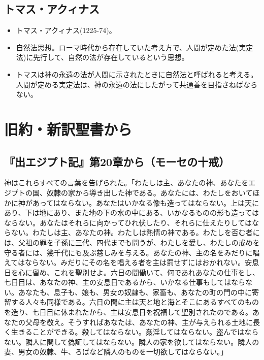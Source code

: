 \documentclass[uplatex,dvipdfmx]{jsarticle} \usepackage{mystyle}%
\begin{document}
\subsection{トマス・アクィナス}
\begin{itemize}
\item トマス・アクィナス(1225-74)。
\item 自然法思想。ローマ時代から存在していた考え方で、人間が定めた法(実定法)に先行して、自然の法が存在しているという思想。
\item トマスは神の永遠の法が人間に示されたときに自然法と呼ばれると考える。人間が定める実定法は、神の永遠の法にしたがって共通善を目指さねばならない。
\end{itemize}





\section{旧約・新訳聖書から}



\subsection*{『出エジプト記』第20章から（モーセの十戒）}

神はこれらすべての言葉を告げられた。「わたしは主、あなたの神、あなたをエジプトの国、奴隷の家から導き出した神である。あなたには、わたしをおいてほかに神があってはならない。あなたはいかなる像も造ってはならない。上は天にあり、下は地にあり、また地の下の水の中にある、いかなるものの形も造ってはならない。あなたはそれらに向かってひれ伏したり、それらに仕えたりしてはならない。わたしは主、あなたの神。わたしは熱情の神である。わたしを否む者には、父祖の罪を子孫に三代、四代までも問うが、わたしを愛し、わたしの戒めを守る者には、幾千代にも及ぶ慈しみを与える。あなたの神、主の名をみだりに唱えてはならない。みだりにその名を唱える者を主は罰せずにはおかれない。安息日を心に留め、これを聖別せよ。六日の間働いて、何であれあなたの仕事をし、七日目は、あなたの神、主の安息日であるから、いかなる仕事もしてはならない。あなたも、息子も、娘も、男女の奴隷も、家畜も、あなたの町の門の中に寄留する人々も同様である。六日の間に主は天と地と海とそこにあるすべてのものを造り、七日目に休まれたから、主は安息日を祝福して聖別されたのである。あなたの父母を敬え。そうすればあなたは、あなたの神、主が与えられる土地に長く生きることができる。殺してはならない。姦淫してはならない。盗んではならない。隣人に関して偽証してはならない。隣人の家を欲してはならない。隣人の妻、男女の奴隷、牛、ろばなど隣人のものを一切欲してはならない。」
\end{document}
